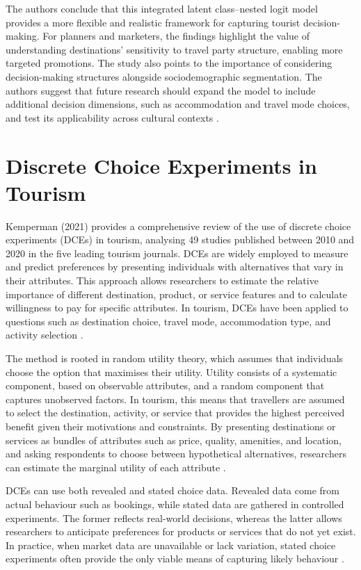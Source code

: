 \documentclass[a4paper, 12pt, twoside]{report}  %
\begin{document}
\indent The authors conclude that this integrated latent class–nested logit model provides a more flexible and realistic framework for capturing tourist decision-making. For planners and marketers, the findings highlight the value of understanding destinations’ sensitivity to travel party structure, enabling more targeted promotions. The study also points to the importance of considering decision-making structures alongside sociodemographic segmentation. The authors suggest that future research should expand the model to include additional decision dimensions, such as accommodation and travel mode choices, and test its applicability across cultural contexts \cite{touristheterogenity}.

\section{Discrete Choice Experiments in Tourism}

\indent Kemperman (2021) provides a comprehensive review of the use of discrete choice experiments (DCEs) in tourism, analysing 49 studies published between 2010 and 2020 in the five leading tourism journals. DCEs are widely employed to measure and predict preferences by presenting individuals with alternatives that vary in their attributes. This approach allows researchers to estimate the relative importance of different destination, product, or service features and to calculate willingness to pay for specific attributes. In tourism, DCEs have been applied to questions such as destination choice, travel mode, accommodation type, and activity selection \cite{discretechoice}. 

\indent The method is rooted in random utility theory, which assumes that individuals choose the option that maximises their utility. Utility consists of a systematic component, based on observable attributes, and a random component that captures unobserved factors. In tourism, this means that travellers are assumed to select the destination, activity, or service that provides the highest perceived benefit given their motivations and constraints. By presenting destinations or services as bundles of attributes such as price, quality, amenities, and location, and asking respondents to choose between hypothetical alternatives, researchers can estimate the marginal utility of each attribute \cite{discretechoice}.

\indent DCEs can use both revealed and stated choice data. Revealed data come from actual behaviour such as bookings, while stated data are gathered in controlled experiments. The former reflects real-world decisions, whereas the latter allows researchers to anticipate preferences for products or services that do not yet exist. In practice, when market data are unavailable or lack variation, stated choice experiments often provide the only viable means of capturing likely behaviour \cite{discretechoice}.
\end{document}
